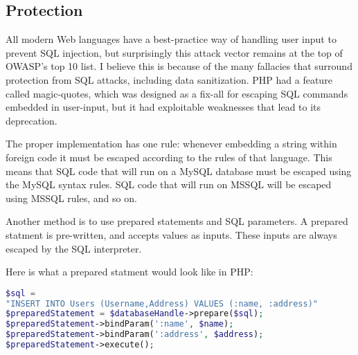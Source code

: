 \subsection{Protection}

All modern Web languages have a best-practice way of handling user input to prevent SQL injection, but surprisingly this attack vector remains at the top of OWASP's top 10 list. I believe this is because of the many fallacies that surround protection from SQL attacks, including data sanitization. PHP had a feature called magic-quotes, which was designed as a fix-all for escaping SQL commands embedded in user-input, but it had exploitable weaknesses that lead to its deprecation.

The proper implementation has one rule: whenever embedding a string within foreign code it must be escaped according to the rules of that language. This means that SQL code that will run on a MySQL database must be escaped using the MySQL syntax rules. SQL code that will run on MSSQL will be escaped using MSSQL rules, and so on.

Another method is to use prepared statements and SQL parameters. A prepared statment is pre-written, and accepts values as inputs. These inputs are always escaped by the SQL interpreter.

Here is what a prepared statment would look like in PHP:
\begin{lstlisting}[language = PHP]
$sql =
"INSERT INTO Users (Username,Address) VALUES (:name, :address)"
$preparedStatement = $databaseHandle->prepare($sql);
$preparedStatement->bindParam(':name', $name);
$preparedStatement->bindParam(':address', $address);
$preparedStatement->execute();
\end{lstlisting}
